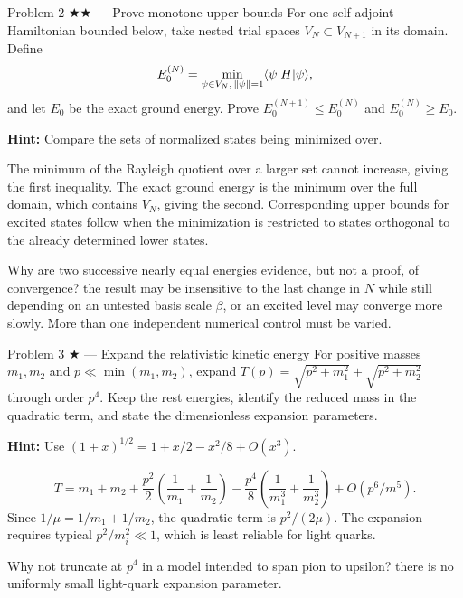 \documentclass[11pt]{article}
\begin{document}
\begin{problem}{Problem 2 ★★ — Prove monotone upper bounds}
For one self-adjoint Hamiltonian bounded below, take nested trial spaces
$V_N\subset V_{N+1}$ in its domain. Define
\[
E_0^{(N)}=\min_{\psi\in V_N,\,\|\psi\|=1}\langle \psi\rvert H\lvert \psi\rangle,
\]
and let $E_0$ be the exact ground energy. Prove
$E_0^{(N+1)}\le E_0^{(N)}$ and $E_0^{(N)}\ge E_0$.

\textbf{Hint:} Compare the sets of normalized states being minimized over.
\end{problem}
\begin{solution}
The minimum of the Rayleigh quotient over a larger set cannot increase, giving
the first inequality. The exact ground energy is the minimum over the full
domain, which contains $V_N$, giving the second. Corresponding upper bounds for
excited states follow when the minimization is restricted to states orthogonal
to the already determined lower states.
\end{solution}
\begin{quiz}
Why are two successive nearly equal energies evidence, but not a proof, of
convergence? \answer the result may be insensitive to the last change in $N$
while still depending on an untested basis scale $\beta$, or an excited level
may converge more slowly. More than one independent numerical control must be
varied.
\end{quiz}

\begin{problem}{Problem 3 ★ — Expand the relativistic kinetic energy}
For positive masses $m_1,m_2$ and $p\ll\min(m_1,m_2)$, expand
$T(p)=\sqrt{p^2+m_1^2}+\sqrt{p^2+m_2^2}$ through order $p^4$.
Keep the rest energies, identify the reduced mass in the quadratic term,
and state the dimensionless expansion parameters.

\textbf{Hint:} Use $(1+x)^{1/2}=1+x/2-x^2/8+O(x^3)$.
\end{problem}
\begin{solution}
\[
T=m_1+m_2+\frac{p^2}{2}\left(\frac1{m_1}+\frac1{m_2}\right)
-\frac{p^4}{8}\left(\frac1{m_1^3}+\frac1{m_2^3}\right)+O(p^6/m^5).
\]
Since $1/\mu=1/m_1+1/m_2$, the quadratic term is $p^2/(2\mu)$. The expansion
requires typical $p^2/m_i^2\ll1$, which is least reliable for light quarks.
\end{solution}
\begin{quiz}
Why not truncate at $p^4$ in a model intended to span pion to upsilon? \answer
there is no uniformly small light-quark expansion parameter.
\end{quiz}
\end{document}
